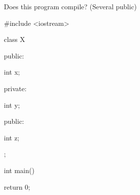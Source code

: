 Does this program compile? (Several public)



\begin{consolethree}[escapeinside=||]

#include <iostream>



class X

{

public:

    int x;

private:

    int y;

public:

    int z;

};



int main()

{

    return 0;

}

\end{consolethree}

